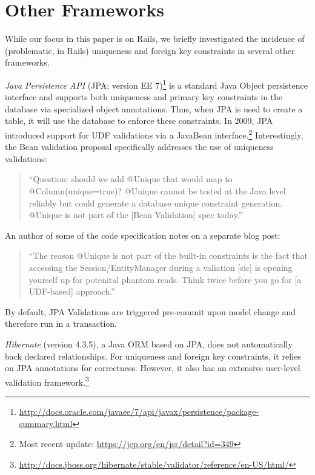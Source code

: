 
\section{Other Frameworks}
\label{sec:other-orms}

While our focus in this paper is on Rails, we briefly investigated the
incidence of (problematic, in Rails) uniqueness and foreign key
constraints in several other frameworks.

\newcommand{\orm}[1]{{\vspace{.45em}\noindent\textit{#1}}}

\orm{Java Persistence API}
(JPA; version EE 7)\footnote{\url{http://docs.oracle.com/javaee/7/api/javax/persistence/package-summary.html}}
is a standard Java Object persistence interface and supports both
uniqueness and primary key constraints in the database via specialized
object annotations. Thus, when JPA is used to create a table, it will
use the database to enforce these constraints. In 2009, JPA introduced
support for UDF validations via a JavaBean interface.\footnote{Most
  recent update: \url{https://jcp.org/en/jsr/detail?id=349}} Interestingly,
the Bean validation proposal specifically addresses the use of
uniqueness validations:
\begin{quote}
``Question: should we add @Unique that would map to @Column(unique=true)?
@Unique cannot be tested at the Java level reliably but could generate
a database unique constraint generation. @Unique is not part
of the [Bean Validation] spec today.''~\cite{jsr-bean}
\end{quote}
An author of some of the code specification notes on a separate blog
post:
\begin{quote}
  ``The reason @Unique is not part of the built-in constraints is the
  fact that accessing the Session/EntityManager during a valiation
  [sic] is opening yourself up for potenital phantom reads. Think
  twice before you go for [a UDF-based] approach.''~\cite{unique-bean}
\end{quote}
By default, JPA Validations are triggered pre-commit upon model
change and therefore run in a transaction.

\orm{Hibernate} (version 4.3.5), a Java ORM based on JPA, does
not automatically back declared relationships. For uniqueness and
foreign key constraints, it relies on JPA annotations for
correctness. However, it also has an extensive user-level validation
framework.\footnote{\url{http://docs.jboss.org/hibernate/stable/validator/reference/en-US/html/}}

